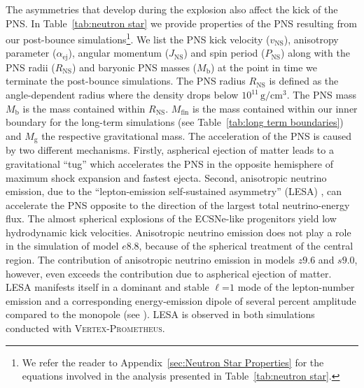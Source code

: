 \documentclass[fleqn,usenatbib]{mnras}
\newcommand{\vertexprom}{\textsc{Vertex-Prometheus}\xspace}
\newcommand{\rns}{\ensuremath{R_{\mathrm{NS}}}\xspace}
\newcommand{\GEO}[1]{{\color{red}#1}}
\begin{document}
The asymmetries that develop during the explosion also affect the kick of the PNS.
In Table~\ref{tab:neutron star} we provide properties of the PNS resulting from our post-bounce simulations\footnote{We refer the reader to Appendix~\ref{sec:Neutron Star Properties} for the equations involved in the analysis presented in Table~\ref{tab:neutron star}.}. We list the PNS kick velocity ($v_{\mathrm{NS}}$), anisotropy parameter ($\alpha_{\mathrm{ej}}$), angular momentum ($J_{\mathrm{NS}}$) and spin period ($P_{\mathrm{NS}}$) along with the PNS radii (\rns) and baryonic PNS masses ($M_{\mathrm{b}}$) at the point in time we terminate the post-bounce simulations. The PNS radius $\rns$ is defined as the angle-dependent radius where the density drops below $10^{11}\,\mathrm{g/cm^3}$. The PNS mass $M_{\mathrm{b}}$ is the mass contained within $\rns$. $M_{\mathrm{fin}}$ is the mass contained within our inner boundary for the long-term simulations (see Table~\ref{tab:long term boundaries}) and $M_{\mathrm{g}}$ the respective gravitational mass.
The acceleration of the PNS is caused by two different mechanisms.
\GEO{Firstly, aspherical ejection of matter leads to a gravitational ``tug'' which accelerates the PNS in the opposite hemisphere of maximum shock expansion and fastest ejecta. Second, anisotropic neutrino emission, due to the ``lepton-emission self-sustained asymmetry'' (LESA) \citep{Tamborra2014}, can accelerate the PNS opposite to the direction of the largest total neutrino-energy flux.
The almost spherical explosions of the ECSNe-like progenitors yield low hydrodynamic kick velocities. Anisotropic neutrino emission does not play a role in the simulation of model $e8.8$, because of the spherical treatment of the central region. The contribution of anisotropic neutrino emission in models $z9.6$ and $s9.0$, however, even exceeds the contribution due to aspherical ejection of matter. LESA manifests itself in a dominant and stable $\ell\mathord{=}1$ mode of the lepton-number emission and a corresponding energy-emission dipole of several percent amplitude compared to the monopole (see \citealt{Tamborra2014}). LESA is observed in both simulations conducted with \vertexprom. }
\end{document}
